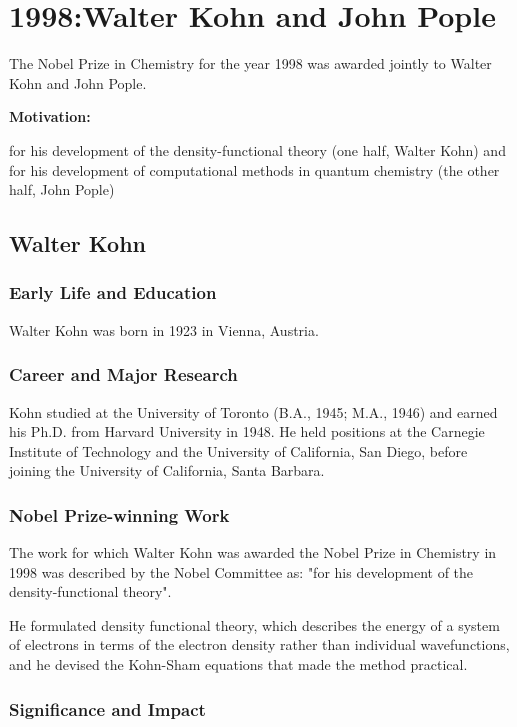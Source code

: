 \chapter{1998:Walter Kohn and John Pople}

\label{chap:chemistry1998}

The Nobel Prize in Chemistry for the year 1998 was awarded jointly to Walter Kohn and John Pople.

\textbf{Motivation:}

for his development of the density-functional theory (one half, Walter Kohn) and for his development of computational methods in quantum chemistry (the other half, John Pople)

\section{Walter Kohn}

\subsection*{Early Life and Education}

Walter Kohn was born in 1923 in Vienna, Austria.

\subsection*{Career and Major Research}

Kohn studied at the University of Toronto (B.A., 1945; M.A., 1946) and earned his Ph.D. from Harvard University in 1948. He held positions at the Carnegie Institute of Technology and the University of California, San Diego, before joining the University of California, Santa Barbara.

\subsection*{Nobel Prize-winning Work}

The work for which Walter Kohn was awarded the Nobel Prize in Chemistry in 1998 was described by the Nobel Committee as: "for his development of the density-functional theory".

He formulated density functional theory, which describes the energy of a system of electrons in terms of the electron density rather than individual wavefunctions, and he devised the Kohn-Sham equations that made the method practical.

\subsection*{Significance and Impact}

